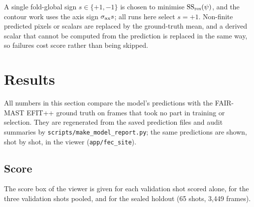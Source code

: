 \documentclass[11pt,a4paper]{article}
\numberwithin{equation}{section}
\begin{document}
A single fold-global sign \(s\in\{+1,-1\}\) is chosen to minimise \(\mathrm{SS}_{\rm res}(\psi)\), and the contour work uses the axis sign \(\sigma_{\rm ax}s\); all runs here select \(s=+1\). Non-finite predicted pixels or scalars are replaced by the ground-truth mean, and a derived scalar that cannot be computed from the prediction is replaced in the same way, so failures cost score rather than being skipped.

\hypertarget{results}{%
\clearpage
\section{Results}\label{results}}

All numbers in this section compare the model's predictions with the FAIR-MAST EFIT++ ground truth on frames that took no part in training or selection. They are regenerated from the saved prediction files and audit summaries by \nolinkurl{scripts/make_model_report.py}; the same predictions are shown, shot by shot, in the viewer (\nolinkurl{app/fec_site}).

\hypertarget{score}{%
\subsection{Score}\label{score}}

The score box of the viewer is given for each validation shot scored alone, for the three validation shots pooled, and for the sealed holdout (65 shots, 3,449 frames).
\end{document}
